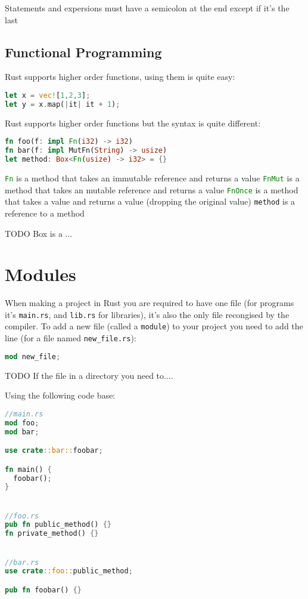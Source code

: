 \documentclass[a4paper,11pt]{article}
\begin{document}
Statements and expersions must have a semicolon at the end except if it's the last

\subsection{Functional Programming}

Rust supports higher order functions, using them is quite easy:

\begin{lstlisting}[language=Rust,frame=single]
let x = vec![1,2,3]; 
let y = x.map(|it| it + 1);
\end{lstlisting}

Rust supports higher order functions but the syntax is quite different:
\begin{lstlisting}[language=Rust,frame=single]
fn foo(f: impl Fn(i32) -> i32)
fn bar(f: impl MutFn(String) -> usize)
let method: Box<Fn(usize) -> i32> = {}
\end{lstlisting}

\lstinline[language=Rust]{Fn} is a method that takes an immutable reference and returns a value
\newline
\lstinline[language=Rust]{FnMut} is a method that takes an mutable reference and returns a value
\newline
\lstinline[language=Rust]{FnOnce} is a method that takes a value and returns a value (dropping the original value)
\newline
\lstinline{method} is a reference to a method

TODO
Box is a ...

\newpage
\section{Modules}
When making a project in Rust you are required to have one file (for programs it's \lstinline{main.rs}, and \lstinline{lib.rs} for libraries), it's also the only file recongised by the compiler. To add a new file (called a \lstinline{module}) to your project you need to add the line (for a file named \lstinline{new_file.rs}):
\begin{lstlisting}[language=Rust,frame=single]
mod new_file;
\end{lstlisting}

TODO
If the file in a directory you need to....

Using the following code base:
\begin{lstlisting}[language=Rust,frame=single]
//main.rs 
mod foo;
mod bar;

use crate::bar::foobar;

fn main() {
  foobar();
}


//foo.rs
pub fn public_method() {}
fn private_method() {}


//bar.rs
use crate::foo::public_method;

pub fn foobar() {}
\end{lstlisting}
\end{document}
